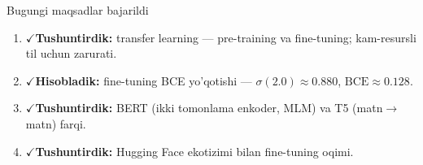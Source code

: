 \documentclass[aspectratio=169,11pt]{beamer}
\newcommand{\bajarildi}{{\color{deepgreen}\large$\checkmark$}\;}
\begin{document}
\begin{frame}{Bugungi maqsadlar bajarildi}
  \begin{enumerate}\setlength\itemsep{7pt}
    \item \bajarildi \textbf{Tushuntirdik:} transfer learning --- pre-training va
          fine-tuning; kam-resursli til uchun zarurati.
    \item \bajarildi \textbf{Hisobladik:} fine-tuning BCE yo'qotishi ---
          $\sigma(2.0)\approx 0.880$, $\mathrm{BCE}\approx 0.128$.
    \item \bajarildi \textbf{Tushuntirdik:} BERT (ikki tomonlama enkoder, MLM)
          va T5 (matn$\to$matn) farqi.
    \item \bajarildi \textbf{Tushuntirdik:} Hugging Face ekotizimi bilan
          fine-tuning oqimi.
  \end{enumerate}
\end{frame}
\end{document}
